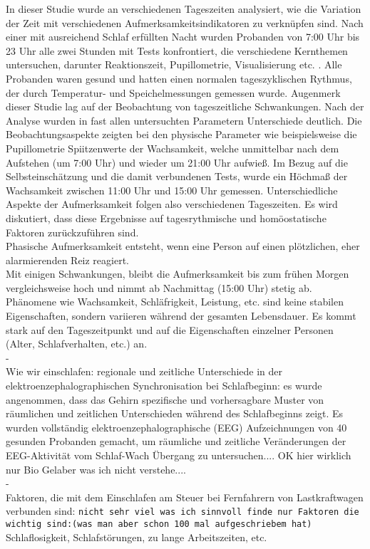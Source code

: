 In dieser Studie wurde an verschiedenen Tageszeiten analysiert, wie die Variation der Zeit mit verschiedenen Aufmerksamkeitsindikatoren zu verknüpfen sind. Nach einer mit ausreichend Schlaf erfüllten Nacht wurden Probanden von 7:00 Uhr bis 23 Uhr alle zwei Stunden mit Tests konfrontiert, die verschiedene Kernthemen untersuchen, darunter Reaktionszeit, Pupillometrie, Visualisierung etc. . Alle Probanden waren gesund und hatten einen normalen tageszyklischen Rythmus, der durch Temperatur- und Speichelmessungen gemessen wurde. Augenmerk dieser Studie lag auf der Beobachtung von tageszeitliche Schwankungen. Nach der Analyse wurden in fast allen untersuchten Parametern Unterschiede deutlich. Die Beobachtungsaspekte zeigten bei den physische Parameter wie beispielsweise die Pupillometrie Spiitzenwerte der Wachsamkeit, welche unmittelbar nach dem Aufstehen (um 7:00 Uhr) und wieder um 21:00 Uhr aufwieß. Im Bezug auf die Selbsteinschätzung und die damit verbundenen Tests, wurde ein Höchmaß der Wachsamkeit zwischen 11:00 Uhr und 15:00 Uhr gemessen. Unterschiedliche Aspekte der Aufmerksamkeit folgen also verschiedenen Tageszeiten. Es wird diskutiert, dass diese Ergebnisse auf tagesrythmische und homöostatische Faktoren zurückzuführen sind.\\
Phasische Aufmerksamkeit entsteht, wenn eine Person auf einen plötzlichen, eher alarmierenden Reiz reagiert.\\
Mit einigen Schwankungen, bleibt die Aufmerksamkeit bis zum frühen Morgen vergleichsweise hoch und nimmt ab Nachmittag (15:00 Uhr) stetig ab.\\
Phänomene wie Wachsamkeit, Schläfrigkeit, Leistung, etc. sind keine stabilen Eigenschaften, sondern variieren während der gesamten Lebensdauer. Es kommt stark auf den Tageszeitpunkt und auf die Eigenschaften einzelner Personen (Alter, Schlafverhalten, etc.) an.\\

-\cite{jewett1999time}\\
Wie wir einschlafen: regionale und zeitliche Unterschiede in der elektroenzephalographischen Synchronisation bei Schlafbeginn:
es wurde angenommen, dass das Gehirn spezifische und vorhersagbare Muster von räumlichen und zeitlichen Unterschieden während des Schlafbeginns zeigt.
Es wurden vollständig elektroenzephalographische (EEG) Aufzeichnungen von 40 gesunden Probanden gemacht, um räumliche und zeitliche Veränderungen der EEG-Aktivität vom Schlaf-Wach Übergang zu untersuchen.... OK hier wirklich nur Bio Gelaber was ich nicht verstehe....\\

- \cite{mccartt2000factors}\\
Faktoren, die mit dem Einschlafen am Steuer bei Fernfahrern von Lastkraftwagen verbunden sind: \texttt{nicht sehr viel was ich sinnvoll finde nur Faktoren die wichtig sind:(was man aber schon 100 mal aufgeschriebem hat)} Schlaflosigkeit, Schlafstörungen, zu lange Arbeitszeiten, etc.\\
